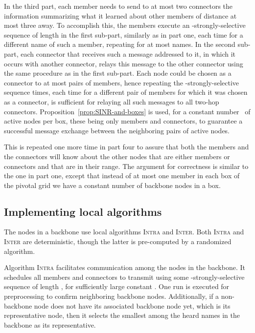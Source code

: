 \documentclass[11pt]{article}
\newcommand{\qed}{\hfill  \smallskip}
\newenvironment{proof}{\noindent{\bf Proof:}}{\qed}
\begin{document}
\begin{proof}
In the third part, each member needs to send  to at most two connectors the information summarizing what it learned about other  members of distance at most three away.
To accomplish this, the members execute an -strongly-selective sequence of length  in the first sub-part, similarly as in part one, each time for a different name of such a member, repeating for at most  names.
In the second sub-part, each connector that receives such a message addressed to it, in which it occurs with another connector, relays this message to the other connector using the same procedure as in the first sub-part. 
Each node could be chosen as a connector to at most  pairs of members, hence repeating the -strongly-selective sequence   times, each time for a different pair of members for which it was chosen as a connector, is sufficient for relaying all such messages to all two-hop connectors.
Proposition~\ref{prop:SINR-and-boxes} is used, for a constant number~ of active nodes  per box, these being only members and connectors, to guarantee a successful message exchange between the neighboring pairs of active nodes.

This is repeated one more time in part four to assure that both the members and the connectors will know about the other nodes that are either  members or connectors and that are in their range. 
The argument for correctness is similar to the one in part one, except that instead of at most one  member in each box of the pivotal grid we have a constant number of backbone nodes in a box.
\end{proof}



\subsection{Implementing local algorithms}

\label{sec:implementing-local-algorithms}


The nodes in a backbone use  local  algorithms \textsc{Intra} and \textsc{Inter}.
Both \textsc{Intra} and \textsc{Inter} are deterministic, though the latter is pre-computed by a randomized algorithm.

Algorithm \textsc{Intra} facilitates communication  among the nodes in the backbone.
It schedules all members and connectors to transmit using some -strongly-selective sequence of length , for sufficiently large constant .
One run is executed for preprocessing to confirm neighboring backbone nodes.
Additionally, if a non-backbone node does not have its associated backbone node yet, which is its representative node, then it selects the smallest among the heard names in the backbone as its representative. 
\end{document}
